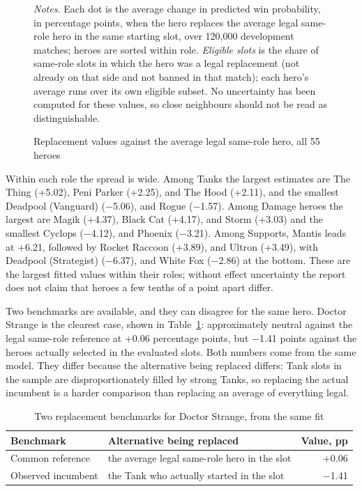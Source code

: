\documentclass[11pt]{article}
\begin{document}
\begin{figure}[H]\centering
\caption{Replacement values against the average legal same-role hero, all 55 heroes}\label{fig:repl}
\vspace{2pt}


\begin{minipage}{0.95\linewidth}\footnotesize\vspace{2pt}
\emph{Notes.} Each dot is the average change in predicted win probability, in percentage points, when the
hero replaces the average legal same-role hero in the same starting slot, over 120,000 development
matches; heroes are sorted within role. \emph{Eligible slots} is the share of same-role slots in which the
hero was a legal replacement (not already on that side and not banned in that match); each hero's average
runs over its own eligible subset. No uncertainty has been computed for these values, so close neighbours
should not be read as distinguishable.
\end{minipage}
\end{figure}

Within each role the spread is wide. Among Tanks the largest estimates are The Thing (+5.02), Peni Parker (+2.25), and The Hood (+2.11), and the smallest
Deadpool (Vanguard) ($-$5.06), and Rogue ($-$1.57). Among Damage heroes the largest are Magik (+4.37), Black Cat (+4.17), and Storm (+3.03) and the smallest Cyclops ($-$4.12), and Phoenix ($-$3.21). Among
Supports, Mantis leads at +6.21, followed by Rocket Raccoon (+3.89), and Ultron (+3.49), with Deadpool (Strategist) ($-$6.37), and White Fox ($-$2.86) at the bottom. These are
the largest fitted values within their roles; without effect uncertainty the report does not claim that
heroes a few tenths of a point apart differ.

Two benchmarks are available, and they can disagree for the same hero. Doctor Strange is the clearest
case, shown in Table~\ref{tab:strange}: approximately neutral against the legal same-role reference at
+0.06 percentage points, but $-$1.41 points against the heroes actually selected in the
evaluated slots. Both numbers come from the same model. They differ because the alternative being replaced
differs: Tank slots in the sample are disproportionately filled by strong Tanks, so replacing the actual
incumbent is a harder comparison than replacing an average of everything legal.

\begin{table}[H]\centering\small
\caption{Two replacement benchmarks for Doctor Strange, from the same fit}\label{tab:strange}
\begin{tabular}{l l r}
\toprule
Benchmark & Alternative being replaced & Value, pp \\
\midrule
Common reference & the average legal same-role hero in the slot & +0.06 \\
Observed incumbent & the Tank who actually started in the slot & $-$1.41 \\
\bottomrule
\end{tabular}
\end{table}
\end{document}
